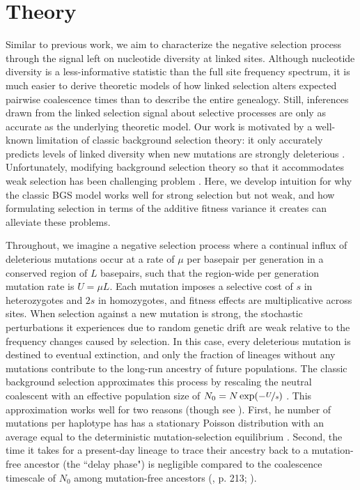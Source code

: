 \documentclass[11pt]{article}
\begin{document}
\section*{Theory}

Similar to previous work, we aim to characterize the negative selection process
through the signal left on nucleotide diversity at linked sites. Although
nucleotide diversity is a less-informative statistic than the full site
frequency spectrum, it is much easier to derive theoretic models of how linked
selection alters expected pairwise coalescence times than to describe the
entire genealogy. Still, inferences drawn from the linked selection signal
about selective processes are only as accurate as the underlying theoretic
model. Our work is motivated by a well-known limitation of classic background
selection theory: it only accurately predicts levels of linked diversity when
new mutations are strongly deleterious
\parencite{Charlesworth1993-gb,McVean2000-bt,Good2013-lp,Gordo2002-dr}.
Unfortunately, modifying background selection theory so that it accommodates
weak selection has been challenging problem
\parencite{Good2014-yz,Haigh1978-gt,Higgs1995-xc}. Here, we develop intuition
for why the classic BGS model works well for strong selection but not weak, and
how formulating selection in terms of the additive fitness variance it creates
can alleviate these problems.

Throughout, we imagine a negative selection process where a continual influx of
deleterious mutations occur at a rate of $\mu$ per basepair per generation in a
conserved region of $L$ basepairs, such that the region-wide per generation
mutation rate is $U = \mu L$. Each mutation imposes a selective cost of $s$ in
heterozygotes and $2s$ in homozygotes, and fitness effects are multiplicative
across sites. When selection against a new mutation is strong, the stochastic
perturbations it experiences due to random genetic drift are weak relative to
the frequency changes caused by selection. In this case, every deleterious
mutation is destined to eventual extinction, and only the fraction of lineages
without any mutations contribute to the long-run ancestry of future
populations. The classic background selection approximates this process by
rescaling the neutral coalescent with an effective population size of $N_0 = N
\exp(-\nicefrac{U}{s})$
\parencite{Charlesworth1993-gb,Nordborg1996-nq,Hudson1995-pt,Hudson1994-oh}.
This approximation works well for two reasons (though see
\cite{Cvijovic2018-vd,Walczak2012-fi,Nicolaisen2012-vs}). First, he number of
mutations per haplotype has has a stationary Poisson distribution with an
average equal to the deterministic mutation-selection equilibrium
\parencite{Haldane1927-ga}. Second, the time it takes for a present-day lineage
to trace their ancestry back to a mutation-free ancestor (the ``delay phase")
is negligible compared to the coalescence timescale of $N_0$ among
mutation-free ancestors (\cite{Durrett2008-ql}, p. 213; \cite{Good2014-yz}).
\end{document}
